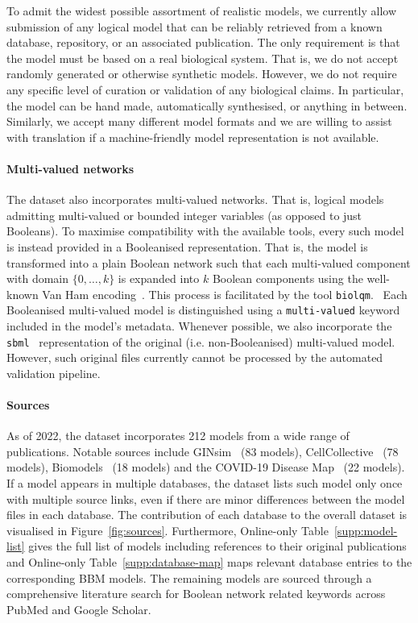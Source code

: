 \documentclass[fleqn,10pt]{wlscirep}
\begin{document}
To admit the widest possible assortment of realistic models, we currently allow submission of any logical model that can be reliably retrieved from a known database, repository, or an associated publication. The only requirement is that the model must be based on a real biological system. That is, we do not accept randomly generated or otherwise synthetic models.  However, we do not require any specific level of curation or validation of any biological claims. In particular, the model can be hand made, automatically synthesised, or anything in between. Similarly, we accept many different model formats and we are willing to assist with translation if a machine-friendly model representation is not available.

\paragraph{Multi-valued networks}

The dataset also incorporates multi-valued networks. That is, logical models admitting multi-valued or bounded integer variables (as opposed to just Booleans). To maximise compatibility with the available tools, every such model is instead provided in a Booleanised representation. That is, the model is transformed into a plain Boolean network such that each multi-valued component with domain $\{ 0, \ldots, k\}$ is expanded into $k$ Boolean components using the well-known Van Ham encoding~\cite{van-ham}. This process is facilitated by the tool \texttt{biolqm}.~\cite{biolqm} Each Booleanised multi-valued model is distinguished using a \texttt{multi-valued} keyword included in the model's metadata. Whenever possible, we also incorporate the \texttt{sbml}~\cite{sbml-qual} representation of the original (i.e. non-Booleanised) multi-valued model. However, such original files currently cannot be processed by the automated validation pipeline.

\paragraph*{Sources} 

As of 2022, the dataset incorporates 212 models from a wide range of publications. Notable sources include GINsim~\cite{ginsim} (83 models), CellCollective~\cite{cell-collective} (78 models), Biomodels~\cite{biomodels} (18 models) and the COVID-19 Disease Map~\cite{bbm-covid-disease-map} (22 models). If a model appears in multiple databases, the dataset lists such model only once with multiple source links, even if there are minor differences between the model files in each database. The contribution of each database to the overall dataset is visualised in Figure~\ref{fig:sources}. Furthermore, Online-only Table~\ref{supp:model-list} gives the full list of models including references to their original publications and Online-only Table~\ref{supp:database-map} maps relevant database entries to the corresponding BBM models. The remaining models are sourced through a comprehensive literature search for Boolean network related keywords across PubMed and Google Scholar.
\end{document}
